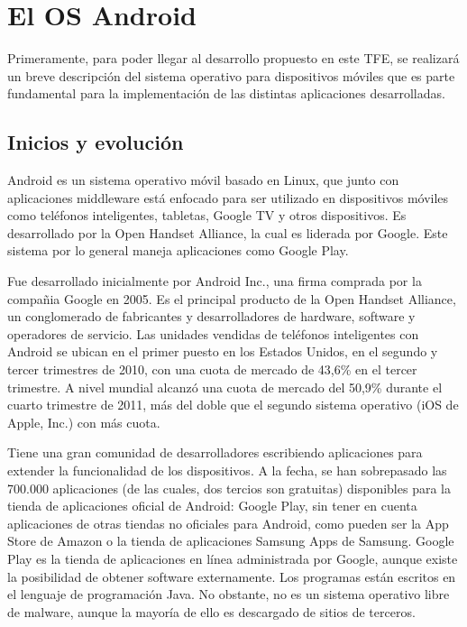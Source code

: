 \chapter{El \ac{OS} Android}

Primeramente, para poder llegar al desarrollo propuesto en este \ac{TFE}, se realizar\'a un breve descripci\'on del sistema operativo para dispositivos m\'oviles que es parte fundamental para la implementaci\'on de las distintas aplicaciones desarrolladas.

\section{Inicios y evoluci\'on}
\label{sec:android.history.1}

Android es un sistema operativo m\'ovil basado en Linux, que junto con aplicaciones middleware est\'a enfocado para ser utilizado en dispositivos m\'oviles como tel\'efonos inteligentes, tabletas, Google TV y otros dispositivos. Es desarrollado por la Open Handset Alliance, la cual es liderada por Google\Si{\texttrademark}. Este sistema por lo general maneja aplicaciones como Google Play.

Fue desarrollado inicialmente por Android Inc., una firma comprada por la compa\~nia Google\Si{\texttrademark} en 2005. Es el principal producto de la Open Handset Alliance, un conglomerado de fabricantes y desarrolladores de hardware, software y operadores de servicio. Las unidades vendidas de tel\'efonos inteligentes con Android se ubican en el primer puesto en los Estados Unidos, en el segundo y tercer trimestres de 2010, con una cuota de mercado de 43,6\% en el tercer trimestre. A nivel mundial alcanz\'o una cuota de mercado del 50,9\% durante el cuarto trimestre de 2011, m\'as del doble que el segundo sistema operativo (iOS de Apple, Inc.) con m\'as cuota.

Tiene una gran comunidad de desarrolladores escribiendo aplicaciones para extender la funcionalidad de los dispositivos. A la fecha, se han sobrepasado las 700.000 aplicaciones (de las cuales, dos tercios son gratuitas) disponibles para la tienda de aplicaciones oficial de Android: Google Play, sin tener en cuenta aplicaciones de otras tiendas no oficiales para Android, como pueden ser la App Store de Amazon o la tienda de aplicaciones Samsung Apps de Samsung. Google Play es la tienda de aplicaciones en l\'inea administrada por Google, aunque existe la posibilidad de obtener software externamente. Los programas est\'an escritos en el lenguaje de programaci\'on Java. No obstante, no es un sistema operativo libre de malware, aunque la mayor\'ia de ello es descargado de sitios de terceros.

